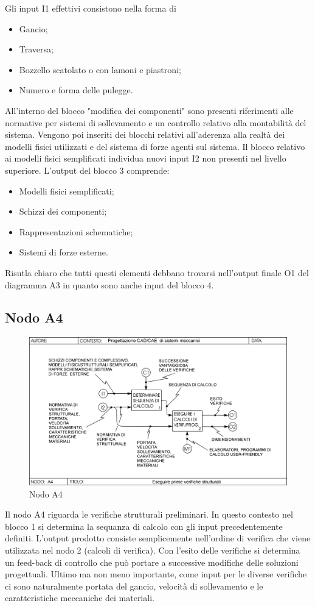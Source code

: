 Gli input I1 effettivi consistono nella forma di
\begin{itemize}
\item Gancio;
\item Traversa;
\item Bozzello scatolato o con lamoni e piastroni;
\item Numero e forma delle pulegge.
\end{itemize}
All'interno del blocco "modifica dei componenti" sono presenti riferimenti alle normative per sistemi di sollevamento e un controllo relativo alla montabilità del sistema. 
Vengono poi inseriti dei blocchi relativi all'aderenza alla realtà dei modelli fisici utilizzati e del sistema di forze agenti sul sistema.
Il blocco relativo ai modelli fisici semplificati individua nuovi input I2 non presenti nel livello superiore.
L'output del blocco 3 comprende:
\begin{itemize}
\item Modelli fisici semplificati;
\item Schizzi dei componenti;
\item Rappresentazioni schematiche;
\item Sistemi di forze esterne.
\end{itemize}
Risutla chiaro che tutti questi elementi debbano trovarsi nell'output finale O1 del diagramma A3 in quanto sono anche input del blocco 4. 

\subsection{Nodo A4}
\begin{figure}[h!]
\centering
  \includegraphics[width=.6\textwidth]{imgs/NodoA4.pdf}
\caption{Nodo A4}
\label{fig:NodoA4}
\end{figure}
Il nodo A4 riguarda le verifiche strutturali preliminari.
In questo contesto nel blocco 1 si determina la sequanza di calcolo con gli input precedentemente definiti.
L'output prodotto consiste semplicemente nell'ordine di verifica che viene utilizzata nel nodo 2 (calcoli di verifica). 
Con l'esito delle verifiche si determina un feed-back di controllo che può portare a successive modifiche delle soluzioni progettuali.
Ultimo ma non meno importante, come input per le diverse verifiche ci sono naturalmente portata del gancio, velocità di sollevamento e le caratteristiche meccaniche dei materiali.

